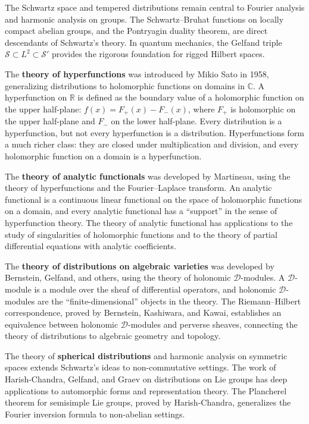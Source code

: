 The Schwartz space and tempered distributions remain central to Fourier analysis and harmonic analysis on groups. The Schwartz--Bruhat functions on locally compact abelian groups, and the Pontryagin duality theorem, are direct descendants of Schwartz's theory. In quantum mechanics, the Gelfand triple $\mathcal{S} \subset L^2 \subset \mathcal{S}'$ provides the rigorous foundation for rigged Hilbert spaces.

The \textbf{theory of hyperfunctions} was introduced by Mikio Sato in 1958, generalizing distributions to holomorphic functions on domains in $\mathbb{C}$. A hyperfunction on $\mathbb{R}$ is defined as the boundary value of a holomorphic function on the upper half-plane: $f(x) = F_+(x) - F_-(x)$, where $F_+$ is holomorphic on the upper half-plane and $F_-$ on the lower half-plane. Every distribution is a hyperfunction, but not every hyperfunction is a distribution. Hyperfunctions form a much richer class: they are closed under multiplication and division, and every holomorphic function on a domain is a hyperfunction.

The \textbf{theory of analytic functionals} was developed by Martineau, using the theory of hyperfunctions and the Fourier--Laplace transform. An analytic functional is a continuous linear functional on the space of holomorphic functions on a domain, and every analytic functional has a ``support'' in the sense of hyperfunction theory. The theory of analytic functional has applications to the study of singularities of holomorphic functions and to the theory of partial differential equations with analytic coefficients.

The \textbf{theory of distributions on algebraic varieties} was developed by Bernstein, Gelfand, and others, using the theory of holonomic $\mathcal{D}$-modules. A $\mathcal{D}$-module is a module over the sheaf of differential operators, and holonomic $\mathcal{D}$-modules are the ``finite-dimensional'' objects in the theory. The Riemann--Hilbert correspondence, proved by Bernstein, Kashiwara, and Kawai, establishes an equivalence between holonomic $\mathcal{D}$-modules and perverse sheaves, connecting the theory of distributions to algebraic geometry and topology.

The theory of \textbf{spherical distributions} and harmonic analysis on symmetric spaces extends Schwartz's ideas to non-commutative settings. The work of Harish-Chandra, Gelfand, and Graev on distributions on Lie groups has deep applications to automorphic forms and representation theory. The Plancherel theorem for semisimple Lie groups, proved by Harish-Chandra, generalizes the Fourier inversion formula to non-abelian settings.

